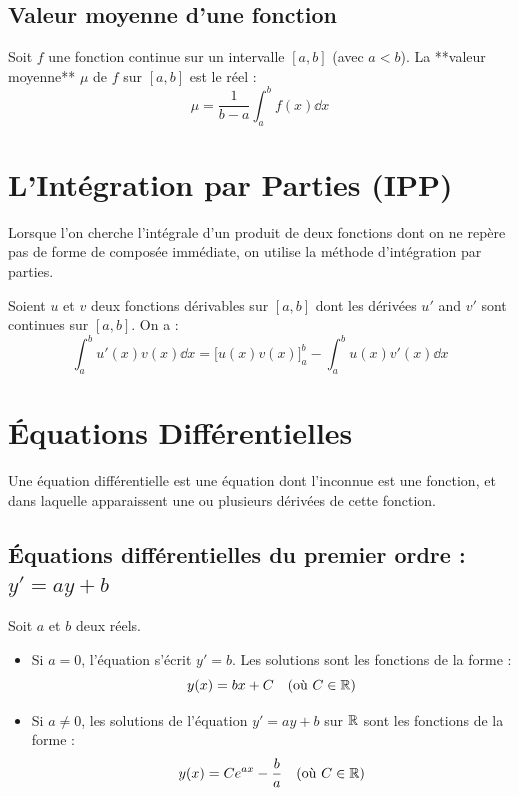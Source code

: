 \subsection{Valeur moyenne d'une fonction}

\begin{definition}
Soit $f$ une fonction continue sur un intervalle $[a, b]$ (avec $a < b$).
La **valeur moyenne** $\mu$ de $f$ sur $[a, b]$ est le réel :
\[
\mu = \frac{1}{b-a} \int_a^b f(x) \dd x
\]
\end{definition}

\section{L'Intégration par Parties (IPP)}

Lorsque l'on cherche l'intégrale d'un produit de deux fonctions dont on ne repère pas de forme de composée immédiate, on utilise la méthode d'intégration par parties.

\begin{theoreme}
Soient $u$ et $v$ deux fonctions dérivables sur $[a, b]$ dont les dérivées $u'$ and $v'$ sont continues sur $[a, b]$. On a :
\[
\int_a^b u'(x) v(x) \dd x = \Big[ u(x) v(x) \Big]_a^b - \int_a^b u(x) v'(x) \dd x
\]
\end{theoreme}

\section{Équations Différentielles}

Une équation différentielle est une équation dont l'inconnue est une fonction, et dans laquelle apparaissent une ou plusieurs dérivées de cette fonction.

\subsection{Équations différentielles du premier ordre : $y' = ay + b$}

\begin{theoreme}[Solutions de $y' = ay + b$]
Soit $a$ et $b$ deux réels.
\begin{itemize}
    \item Si $a = 0$, l'équation s'écrit $y' = b$. Les solutions sont les fonctions de la forme :
    \[
    y(x) = bx + C \quad (\text{où } C \in \mathbb{R})
    \]
    \item Si $a \ne 0$, les solutions de l'équation $y' = ay + b$ sur $\mathbb{R}$ sont les fonctions de la forme :
    \[
    y(x) = C e^{ax} - \frac{b}{a} \quad (\text{où } C \in \mathbb{R})
    \]
\end{itemize}
\end{theoreme}

